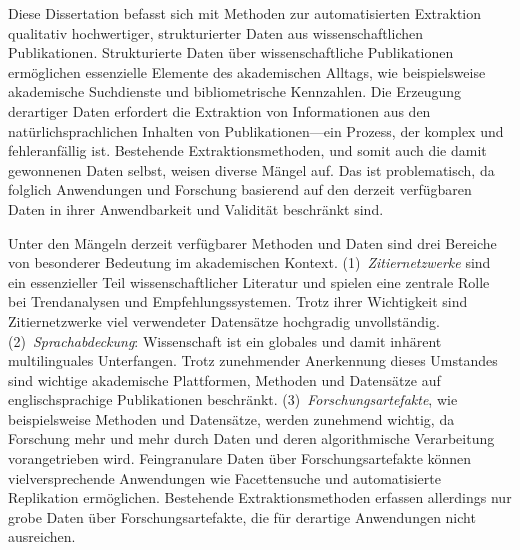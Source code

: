 \Abstract[Zusammenfassung]{}
Diese Dissertation befasst sich mit Methoden zur automatisierten Extraktion qualitativ hochwertiger, strukturierter Daten aus wissenschaftlichen Publikationen.
Strukturierte Daten über wissenschaftliche Publikationen ermöglichen essenzielle Elemente des akademischen Alltags, wie beispielsweise akademische Suchdienste und bibliometrische Kennzahlen.
Die Erzeugung derartiger Daten erfordert die Extraktion von Informationen aus den natürlichsprachlichen Inhalten von Publikationen---ein Prozess, der komplex und fehleranfällig ist.
Bestehende Extraktionsmethoden, und somit auch die damit gewonnenen Daten selbst, weisen diverse Mängel auf. Das ist problematisch, da folglich Anwendungen und Forschung basierend auf den derzeit verfügbaren Daten in ihrer Anwendbarkeit und Validität beschränkt sind.

Unter den Mängeln derzeit verfügbarer Methoden und Daten sind drei Bereiche von besonderer Bedeutung im akademischen Kontext.
(1)~\emph{Zitiernetzwerke} sind ein essenzieller Teil wissenschaftlicher Literatur und spielen eine zentrale Rolle bei Trendanalysen und Empfehlungssystemen. Trotz ihrer Wichtigkeit sind Zitiernetzwerke viel verwendeter Datensätze hochgradig unvollständig.
(2)~\emph{Sprachabdeckung}: Wissenschaft ist ein globales und damit inhärent multilinguales Unterfangen. Trotz zunehmender Anerkennung dieses Umstandes sind wichtige akademische Plattformen, Methoden und Datensätze auf englischsprachige Publikationen beschränkt.
(3)~\emph{Forschungsartefakte}, wie beispielsweise Methoden und Datensätze, werden zunehmend wichtig, da Forschung mehr und mehr durch Daten und deren algorithmische Verarbeitung vorangetrieben wird. Feingranulare Daten über Forschungsartefakte können vielversprechende Anwendungen wie Facettensuche und automatisierte Replikation ermöglichen. Bestehende Extraktionsmethoden erfassen allerdings nur grobe Daten über Forschungsartefakte, die für derartige Anwendungen nicht ausreichen.

